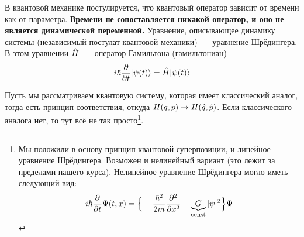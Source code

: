 В квантовой механике постулируется, что квантовый оператор зависит от времени как от параметра. \textbf{Времени не сопоставляется никакой оператор, и оно не является динамической переменной.} Уравнение, описывающее динамику системы (независимый постулат квантовой механики)~--- уравнение Шрёдингера. В этом уравнении $\Hat H$~--- оператор Гамильтона (гамильтониан) 
$$
    i \hbar \dfrac{\partial }{\partial t} | \psi(t) \rangle = \Hat H | \psi(t) \rangle
$$

\Ans Пусть мы рассматриваем квантовую систему, которая имеет классический аналог, тогда есть принцип соответствия, откуда $H(q, p) \to H(\Hat q, \Hat p)$. Если классического аналога нет, то тут всё не так просто\footnote{Мы положили в основу принцип квантовой суперпозиции, и линейное уравнение Шрёдингера.
Возможен и нелинейный вариант (это лежит за пределами нашего курса). Нелинейное уравнение Шрёдингера могло иметь следующий вид:
$$
    i \hbar \dfrac{\partial }{\partial t} \Psi(t, x) = \Big\{
        -\dfrac{\hbar^2}{2m} \dfrac{\partial^2}{\partial x^2} - \underbrace{G}_{\mathrm{const}} |\psi|^2
    \Big\} \Psi
$$}.

